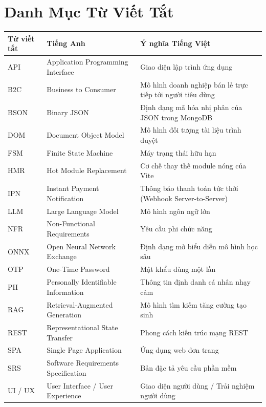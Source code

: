 \documentclass[12pt,a4paper]{report}
\begin{document}
\newpage

\tableofcontents
\newpage

\listoffigures
{}
\newpage

\listoftables
{}
\newpage

\chapter*{Danh Mục Từ Viết Tắt}
\begin{table}[H]
\centering
\begin{tabularx}{\textwidth}{p{3.5cm}p{5.5cm}X}
\toprule
\textbf{Từ viết tắt} & \textbf{Tiếng Anh} & \textbf{Ý nghĩa Tiếng Việt} \\
\midrule
API & Application Programming Interface & Giao diện lập trình ứng dụng \\
B2C & Business to Consumer & Mô hình doanh nghiệp bán lẻ trực tiếp tới người tiêu dùng \\
BSON & Binary JSON & Định dạng mã hóa nhị phân của JSON trong MongoDB \\
DOM & Document Object Model & Mô hình đối tượng tài liệu trình duyệt \\
FSM & Finite State Machine & Máy trạng thái hữu hạn \\
HMR & Hot Module Replacement & Cơ chế thay thế module nóng của Vite \\
IPN & Instant Payment Notification & Thông báo thanh toán tức thời (Webhook Server-to-Server) \\
LLM & Large Language Model & Mô hình ngôn ngữ lớn \\
NFR & Non-Functional Requirements & Yêu cầu phi chức năng \\
ONNX & Open Neural Network Exchange & Định dạng mở biểu diễn mô hình học sâu \\
OTP & One-Time Password & Mật khẩu dùng một lần \\
PII & Personally Identifiable Information & Thông tin định danh cá nhân nhạy cảm \\
RAG & Retrieval-Augmented Generation & Mô hình tìm kiếm tăng cường tạo sinh \\
REST & Representational State Transfer & Phong cách kiến trúc mạng REST \\
SPA & Single Page Application & Ứng dụng web đơn trang \\
SRS & Software Requirements Specification & Bản đặc tả yêu cầu phần mềm \\
UI / UX & User Interface / User Experience & Giao diện người dùng / Trải nghiệm người dùng \\
\bottomrule
\end{tabularx}
\end{table}
\newpage
\end{document}
